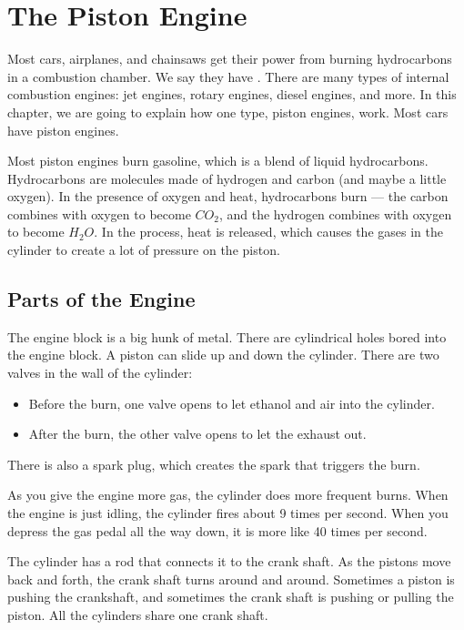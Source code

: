 \chapter{The Piston Engine}

Most cars, airplanes, and chainsaws get their power from burning hydrocarbons in a 
combustion chamber. We say they have . There are many types of internal combustion engines: jet engines, rotary engines, diesel engines, and more. In this chapter, we are 
going to explain how one type, piston engines, work. Most cars have piston engines. 

Most piston engines burn gasoline, which is a blend of liquid hydrocarbons. Hydrocarbons are molecules made of hydrogen and carbon (and maybe a little oxygen). In the presence of oxygen and heat, hydrocarbons burn --- the carbon combines with oxygen to become $CO_2$, and the hydrogen combines with oxygen to become $H_2O$. In the process, heat is released, which causes the gases in the cylinder to create a lot of pressure on the piston.


\section{Parts of the Engine}
The engine block is a big hunk of metal. There are cylindrical holes bored into the engine block. A piston can slide up and down the cylinder. There are two valves in the wall of the cylinder: 
\begin{itemize}
\item Before the burn, one valve opens to let ethanol and air into the cylinder.
\item After the burn, the other valve opens to let the exhaust out.
\end{itemize}

There is also a spark plug, which creates the spark that triggers the burn.

As you give the engine more gas, the cylinder does more frequent burns. When the engine is just idling, the cylinder fires about 9 times per second. When you depress the gas pedal all the way down, it is more like 40 times per second.

The cylinder has a rod that connects it to the crank shaft. As the pistons move back and forth, the crank shaft turns around and around. Sometimes a piston is pushing the crankshaft, and sometimes the crank shaft is pushing or pulling the piston. All the cylinders share one crank shaft.

